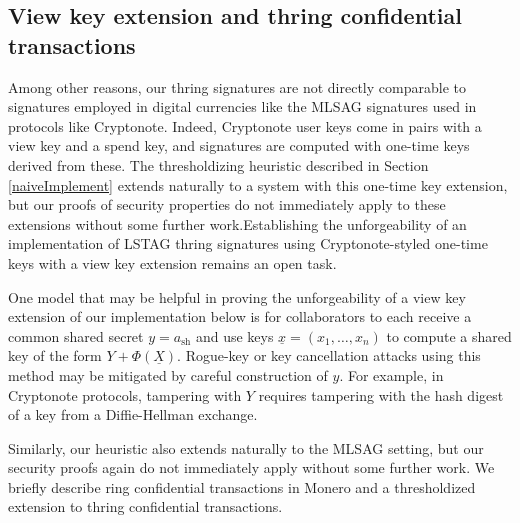 \documentclass{iacrtrans}
\theoremstyle{definition}
\numberwithin{theorem}{subsection}
\numberwithin{lemma}{theorem}
\begin{document}
\subsection{View key extension and thring confidential transactions}

Among other reasons, our thring signatures are not directly comparable to signatures employed in digital currencies like the MLSAG signatures used in protocols like Cryptonote. Indeed, Cryptonote user keys come in pairs with a view key and a spend key, and signatures are computed with one-time keys derived from these. The thresholdizing heuristic described in Section \ref{naiveImplement} extends naturally to a system with this one-time key extension, but our proofs of security properties do not immediately apply to these extensions without some further work.Establishing the unforgeability of an implementation of LSTAG thring signatures using Cryptonote-styled one-time keys with a view key extension remains an open task.

One model that may be helpful in proving the unforgeability of a view key extension of our implementation below is for collaborators to each receive a common shared secret $y = a_{\text{sh}}$ and use keys $\underline{x} = (x_1, \ldots, x_n)$ to compute a shared key of the form $Y + \Phi(\underline{X})$. Rogue-key or key cancellation attacks using this method may be mitigated by careful construction of $y$. For example, in Cryptonote protocols, tampering with $Y$ requires tampering with the hash digest of a key from a Diffie-Hellman exchange.

Similarly, our heuristic also extends naturally to the MLSAG setting, but our security proofs again do not immediately apply without some further work.  We briefly describe ring confidential transactions in Monero and a thresholdized extension to thring confidential transactions. 
\end{document}
